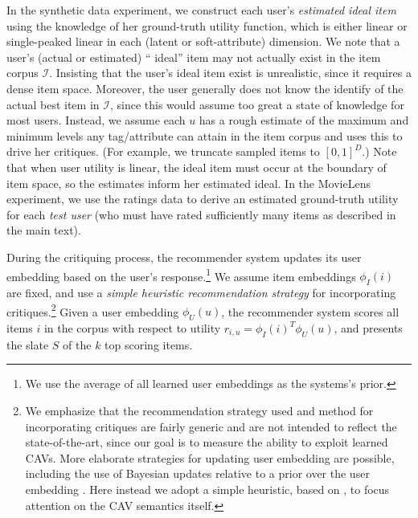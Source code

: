 \documentclass[manuscript,screen,nonacm]{acmart}
\newcommand{\1}{{\mathbf 1}}
\newcommand{\calI}{\mathcal{I}}
\theoremstyle{TheoremNum}
\begin{document}
In the synthetic data experiment, we construct each user's \emph{estimated ideal item} using the knowledge of her ground-truth utility function, which is either linear or single-peaked linear in each (latent or soft-attribute) dimension. We note that a user's (actual or estimated) `` ideal'' item may not actually exist in the item corpus $\calI$. Insisting that the user's ideal item exist is unrealistic, since it requires a dense item space. Moreover, the user generally does not know the identify of the actual best item in $\calI$, since this would assume too great a state of knowledge for most users. Instead, we assume each $u$ has a rough estimate of the maximum and minimum levels any tag/attribute can attain in the item corpus and uses this to drive her critiques. (For example, we truncate sampled items to $[0,1]^D$.)
Note that when user utility is linear, the ideal item must occur at the boundary of item space, so the estimates inform her estimated ideal.
In the MovieLens experiment, we use the ratings data to derive an estimated ground-truth utility for each \emph{test user} (who must have rated sufficiently many items as described in the main text). 

During the critiquing process, the recommender system updates its user embedding based on the user's response.\footnote{We use the average of all learned user embeddings as the systems's prior.}
We assume item embeddings $\phi_I(i)$ are fixed, and use a \emph{simple heuristic recommendation strategy} for incorporating critiques.\footnote{We emphasize that the recommendation strategy used and method for incorporating critiques are fairly generic and are not intended to reflect the state-of-the-art, since our goal is to measure the ability to exploit learned CAVs. More elaborate strategies for updating user embedding are possible, including the use of Bayesian updates relative to a prior over the user embedding \cite{vendrov2020gradient}. Here instead we adopt a simple heuristic, based on \cite{luo2020latent}, to focus attention on the CAV semantics itself.} Given a user embedding $\phi_U(u)$, the recommender system scores all items $i$ in the corpus with respect to utility $r_{i,u} = \phi_I(i)^T\phi_U(u)$, and presents the slate $S$ of the $k$ top scoring items. 
\end{document}
